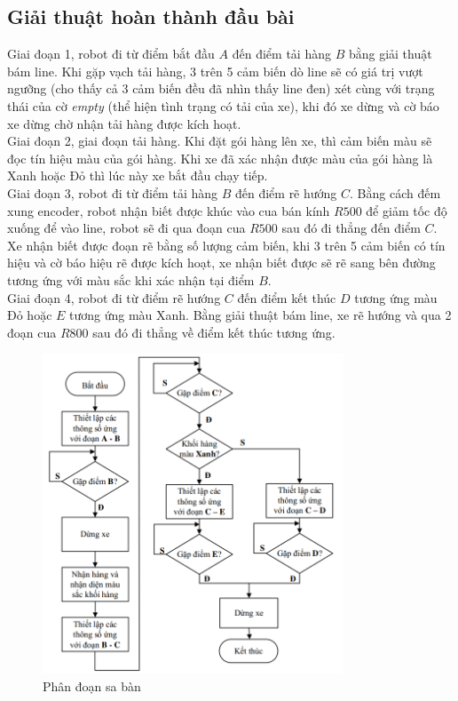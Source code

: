           \subsection{Giải thuật hoàn thành đầu bài}
               \hspace*{0.6cm}Giai đoạn 1, robot đi từ điểm bắt đầu $A$ đến điểm tải hàng $B$ bằng giải thuật bám line. Khi gặp vạch tải hàng, 3 trên 5 cảm biến dò line sẽ có giá trị vượt ngưỡng (cho thấy cả 3 cảm biến đều đã nhìn thấy line đen)
               xét cùng với trạng thái của cờ \textit{empty} (thể hiện tình trạng có tải của xe), khi đó xe dừng và cờ báo xe dừng chờ nhận tải hàng được kích hoạt.\\
               \hspace*{0.6cm}Giai đoạn 2, giai đoạn tải hàng. Khi đặt gói hàng lên xe, thì cảm biến màu sẽ đọc
               tín hiệu màu của gói hàng. Khi xe đã xác nhận được màu của gói hàng là Xanh hoặc
               Đỏ thì lúc này xe bắt đầu chạy tiếp.\\
               \hspace*{0.6cm}Giai đoạn 3, robot đi từ điểm tải hàng $B$ đến điểm rẽ hướng $C$. Bằng cách đếm xung encoder, robot nhận biết được khúc vào cua bán kính $R500$ để giảm tốc độ xuống để vào line, robot sẽ đi qua đoạn cua $R500$ sau đó đi thẳng đến điểm $C$. Xe nhận biết
               được đoạn rẽ bằng số lượng cảm biến, khi 3 trên 5 cảm biến có tín hiệu và cờ báo hiệu rẽ được kích hoạt,
               xe nhận biết được sẽ rẽ sang bên đường tương ứng với màu sắc khi xác nhận tại điểm $B$.\\
               \hspace*{0.6cm}Giai đoạn 4, robot đi từ điểm rẽ hướng $C$ đến điểm kết thúc $D$ tương ứng màu Đỏ
               hoặc $E$ tương ứng màu Xanh. Bằng giải thuật bám line, xe rẽ hướng và qua 2 đoạn
               cua $R800$ sau đó đi thẳng về điểm kết thúc tương ứng.
               \begin{figure}[H]
                    \centering
                    \includegraphics[width=0.8\textwidth]{pictures/chapter7/flow2.png}
                    \caption{Phân đoạn sa bàn}
                    \label{flow2}
               \end{figure}



